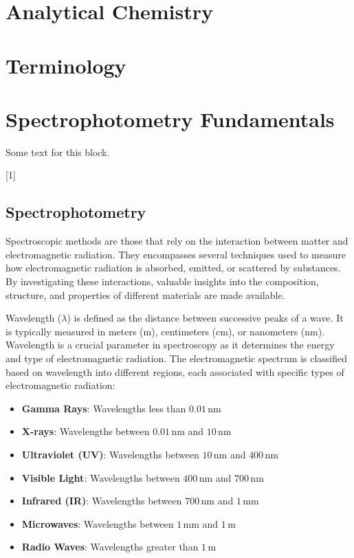 \documentclass[
  9pt,
  american,
  a5paper,
  extrafontsizes,onecolumn,openright
  ]{memoir}
\providecommand{\tightlist}{%
  \setlength{\itemsep}{0pt}\setlength{\parskip}{0pt}}
\newenvironment{Summary}
  {\begin{bclogo}[logo=\bctrombone, noborder=true, couleur=lightgray!50]{}\parindent0pt}
  {\end{bclogo}}
\newcommand{\toc}[1]{%
  \startcontents[chapters]%
  \printcontents[chapters]{}{1}[#1]{}%
  ~\newline%
}
\begin{document}
\chapter{Analytical Chemistry}\label{analytical-chemistry}

\chapter{Terminology}\label{terminology}

\chapter{Spectrophotometry Fundamentals}\label{spectrophotometry-fundamentals}

\begin{Summary}
Some text for this block.

\end{Summary}

\toc{1}

\newpage

\section{Spectrophotometry}\label{spectrophotometry}

Spectroscopic methods are those that rely on the interaction between matter and electromagnetic radiation. They encompasses several techniques used to measure how electromagnetic radiation is absorbed, emitted, or scattered by substances. By investigating these interactions, valuable insights into the composition, structure, and properties of different materials are made available.

Wavelength (\(\lambda\)) is defined as the distance between successive peaks of a wave. It is typically measured in meters (m), centimeters (cm), or nanometers (nm). Wavelength is a crucial parameter in spectroscopy as it determines the energy and type of electromagnetic radiation. The electromagnetic spectrum is classified based on wavelength into different regions, each associated with specific types of electromagnetic radiation:

\begin{itemize}
\tightlist
\item
  \textbf{Gamma Rays}: Wavelengths less than \(0.01 \, \text{nm}\)
\item
  \textbf{X-rays}: Wavelengths between \(0.01 \, \text{nm}\) and \(10 \, \text{nm}\)
\item
  \textbf{Ultraviolet (UV)}: Wavelengths between \(10 \, \text{nm}\) and \(400 \, \text{nm}\)
\item
  \textbf{Visible Light}: Wavelengths between \(400 \, \text{nm}\) and \(700 \, \text{nm}\)
\item
  \textbf{Infrared (IR)}: Wavelengths between \(700 \, \text{nm}\) and \(1 \, \text{mm}\)
\item
  \textbf{Microwaves}: Wavelengths between \(1 \, \text{mm}\) and \(1 \, \text{m}\)
\item
  \textbf{Radio Waves}: Wavelengths greater than \(1 \, \text{m}\)
\end{itemize}
\end{document}
